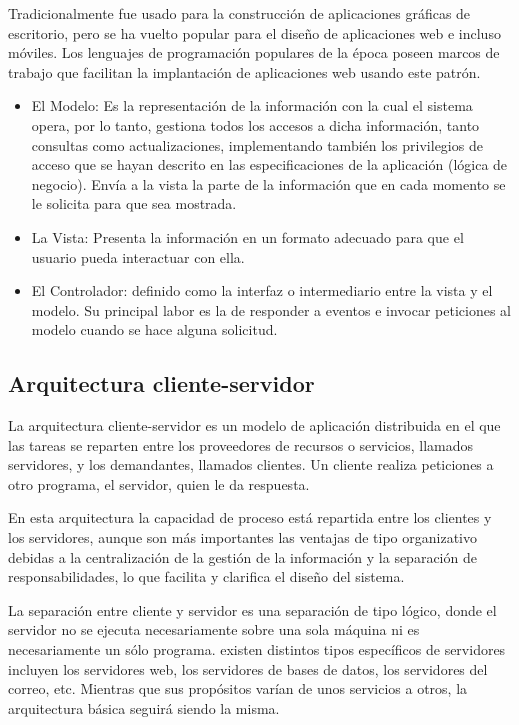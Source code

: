 Tradicionalmente fue usado para la construcción de aplicaciones gráficas de escritorio, pero se ha vuelto popular para el diseño de aplicaciones web e incluso móviles. Los lenguajes de programación populares de la época poseen marcos de trabajo que facilitan la implantación de aplicaciones web usando este patrón.

\begin{itemize}

\item El Modelo: Es la representación de la información con la cual el sistema opera, por lo tanto, gestiona todos los accesos a dicha información, tanto consultas como actualizaciones, implementando también los privilegios de acceso que se hayan descrito en las especificaciones de la aplicación (lógica de negocio). Envía a la vista la parte de la información que en cada momento se le solicita para que sea mostrada.

\item La Vista: Presenta la información en un formato adecuado para que el usuario pueda interactuar con ella.

\item El Controlador: definido como la interfaz o intermediario entre la vista y el modelo. Su principal labor es la de responder a eventos e invocar peticiones al modelo cuando se hace alguna solicitud. 

\end{itemize}

\subsection{Arquitectura cliente-servidor}

La arquitectura cliente-servidor es un modelo de aplicación distribuida en el que las tareas se reparten entre los proveedores de recursos o servicios, llamados servidores, y los demandantes, llamados clientes. Un cliente realiza peticiones a otro programa, el servidor, quien le da respuesta.

En esta arquitectura la capacidad de proceso está repartida entre los clientes y los servidores, aunque son más importantes las ventajas de tipo organizativo debidas a la centralización de la gestión de la información y la separación de responsabilidades, lo que facilita y clarifica el diseño del sistema.

La separación entre cliente y servidor es una separación de tipo lógico, donde el servidor no se ejecuta necesariamente sobre una sola máquina ni es necesariamente un sólo programa. existen distintos tipos específicos de servidores incluyen los servidores web, los servidores de bases de datos, los servidores del correo, etc. Mientras que sus propósitos varían de unos servicios a otros, la arquitectura básica seguirá siendo la misma\cite{bib:clienteServidor}.

